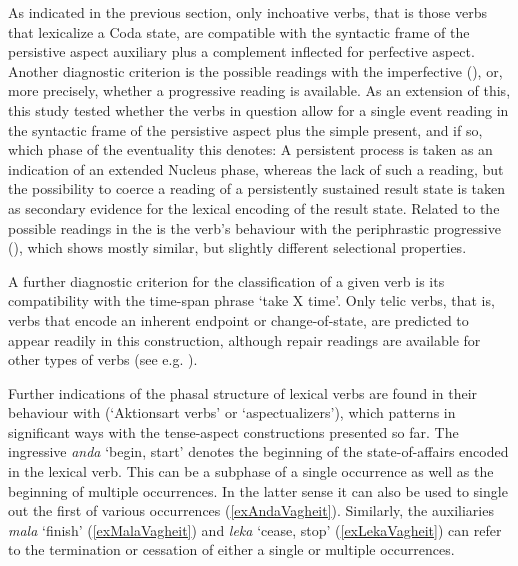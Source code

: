 As indicated in the previous section, only inchoative verbs, that is those verbs that lexicalize a Coda state, are compatible with the syntactic frame of the persistive aspect auxiliary plus a complement inflected for perfective aspect. Another diagnostic criterion is the possible readings with the imperfective  (), or, more precisely, whether a progressive reading is available. As an extension of this, this study tested whether the verbs in question allow for a single event reading in the syntactic frame of the persistive aspect  plus the simple present, and if so, which phase of the eventuality this denotes: A persistent process is taken as an indication of an extended Nucleus phase, whereas the lack of such a reading, but the possibility to coerce a reading of a persistently sustained result state is taken as secondary evidence for the lexical encoding of the result state. Related to the possible readings in the  is the verb's behaviour with the periphrastic progressive (), which shows mostly similar, but slightly different selectional properties.

A further diagnostic criterion for the classification of a given verb is its compatibility with the time-span phrase \lq take X time'. Only telic verbs, that is, verbs that encode an inherent endpoint or change-of-state, are predicted to appear readily in this construction, although repair readings are available for other types of verbs (see e.g. \citealt[57]{DowtyD1979}).

Further indications of the phasal structure of lexical verbs are found in their behaviour with  (\lq Aktionsart verbs' or \lq aspectualizers'), which patterns in significant ways with the tense-aspect constructions presented so far. The ingressive  \textit{anda} \lq begin, start' denotes the beginning of the state-of-affairs encoded in the lexical verb. This can be a subphase of a single occurrence as well as the beginning of multiple occurrences. In the latter sense it can also be used to single out the first of various occurrences (\ref{exAndaVagheit}). Similarly, the auxiliaries \textit{mala} \lq finish' (\ref{exMalaVagheit}) and \textit{leka} \lq cease, stop' (\ref{exLekaVagheit}) can refer to the termination or cessation of either a single or multiple occurrences.

